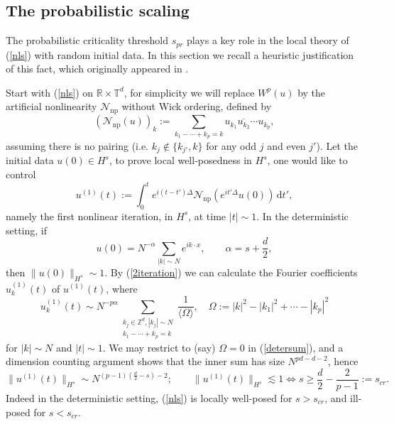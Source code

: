 \documentclass[11 pt,reqno]{amsart}
\theoremstyle{definition}
\theoremstyle{remark}
\numberwithin{equation}{section}
\newcommand{\Nc}{\mathcal{N}}
\newcommand{\Tb}{\mathbb{T}}
\newcommand{\Rb}{\mathbb{R}}
\newcommand{\Zb}{\mathbb{Z}}
\begin{document}
 \subsection{The probabilistic scaling}\label{heuristic} The probabilistic criticality threshold $s_{pr}$ plays a key role in the local theory of (\ref{nls}) with random initial data. In this section we recall a heuristic justification of this fact, which originally appeared in \cite{DNY}.
 
Start with (\ref{nls}) on $\Rb\times\Tb^d$, for simplicity we will replace $W^p(u)$ by the artificial nonlinearity $\Nc_{\mathrm{np}}$ without Wick ordering, defined by\begin{equation}\label{nopairintro}(\Nc_{\mathrm{np}}(u))_k:=\sum_{k_1-\cdots +k_p=k}u_{k_1}\overline{u_{k_2}}\cdots u_{k_p},\end{equation} assuming there is no pairing (i.e. $k_j\not\in\{ k_{j'},k\}$ for any odd $j$ and even $j'$). Let the initial data $u(0)\in H^s$, to prove local well-posedness in $H^s$, one would like to control
 \begin{equation}\label{2iteration}u^{(1)}(t):=\int_0^te^{i(t-t')\Delta}\Nc_{\mathrm{np}}(e^{it'\Delta}u(0))\,\mathrm{d}t',\end{equation} namely the first nonlinear iteration, in $H^s$, at time $|t|\sim 1$. In the deterministic setting, if
 \begin{equation}\label{deterdata}u(0)=N^{-\alpha}\sum_{|k|\sim N}e^{ik\cdot x},\qquad \alpha=s+\frac{d}{2},
 \end{equation} then $\|u(0)\|_{H^s}\sim 1$. By (\ref{2iteration}) we can calculate the Fourier coefficients $u_k^{(1)}(t)$ of $u^{(1)}(t)$, where
 \begin{equation}\label{detersum}u_k^{(1)}(t)\sim N^{-p\alpha}\sum_{\substack{k_j\in\Zb^d,|k_j|\sim N\\k_1-\cdots+k_p=k}}\frac{1}{\langle\Omega\rangle},\quad \Omega:=|k|^2-|k_1|^2+\cdots-|k_p|^2
 \end{equation} for $|k|\sim N$ and $|t|\sim 1$. We may restrict to (say) $\Omega=0$ in (\ref{detersum}), and a dimension counting argument shows that the inner sum has size $N^{pd-d-2}$, hence 
 \begin{equation}\label{detersc}\|u^{(1)}(t)\|_{H^s}\sim N^{(p-1)(\frac{d}{2}-s)-2};\qquad \|u^{(1)}(t)\|_{H^s}\lesssim 1 \Leftrightarrow s\geq \frac{d}{2}-\frac{2}{p-1}:=s_{cr}.
 \end{equation} Indeed in the deterministic setting, (\ref{nls}) is locally well-posed for $s>s_{cr}$, and ill-posed for $s<s_{cr}$.
 
\end{document}

